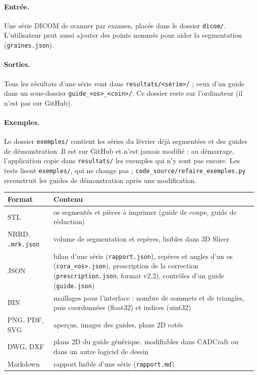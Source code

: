 \documentclass[11pt,a4paper]{article}
\newcommand{\fichier}[1]{\texttt{\small #1}}
\begin{document}
\paragraph{Entrée.} Une série DICOM de scanner par examen, placée dans le dossier \fichier{dicom/}. L'utilisateur peut
aussi ajouter des points nommés pour aider la segmentation (\fichier{graines.json}).

\paragraph{Sorties.} Tous les résultats d'une série vont dans \fichier{resultats/<série>/} ; ceux d'un guide dans un
sous-dossier \fichier{guide\_<os>\_<coin>/}. Ce dossier reste sur l'ordinateur (il n'est pas sur GitHub).

\paragraph{Exemples.} Le dossier \fichier{exemples/} contient les séries du lévrier déjà segmentées et des guides de
démonstration. Il est sur GitHub et n'est jamais modifié : au démarrage, l'application copie dans
\fichier{resultats/} les exemples qui n'y sont pas encore. Les tests lisent \fichier{exemples/}, qui ne change
pas ; \fichier{code\_source/refaire\_exemples.py} reconstruit les guides de démonstration après une modification.

\begin{tabularx}{\textwidth}{@{}lX@{}}
\toprule
\textbf{Format} & \textbf{Contenu} \\ \midrule
STL & os segmentés et pièces à imprimer (guide de coupe, guide de réduction) \\
NRRD, \fichier{.mrk.json} & volume de segmentation et repères, lisibles dans 3D Slicer \\
JSON & bilan d'une série (\fichier{rapport.json}), repères et angles d'un os (\fichier{cora\_<os>.json}),
  prescription de la correction (\fichier{prescription.json}, format v2.2), contrôles d'un guide (\fichier{guide.json}) \\
BIN & maillages pour l'interface : nombre de sommets et de triangles, puis coordonnées (float32) et indices (uint32) \\
PNG, PDF, SVG & aperçus, images des guides, plans 2D cotés \\
DWG, DXF & plans 2D du guide générique, modifiables dans CADCraft ou dans un autre logiciel de dessin \\
Markdown & rapport lisible d'une série (\fichier{rapport.md}) \\
\bottomrule
\end{tabularx}
\end{document}
